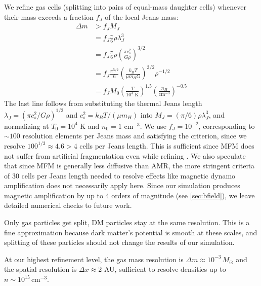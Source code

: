 \documentclass[twocolumn]{openjournal}
\newcommand{\Msun}{M_\odot}
\begin{document}
We refine gas cells (splitting into pairs of equal-mass daughter cells)
whenever their mass exceeds a fraction $f_J$ of the local Jeans mass:
\begin{equation}
	\begin{aligned}
		\Delta m & > f_J M_J                                                                                                \\
		         & = f_J \frac{\pi}{6} \rho \lambda_J^3                                                                     \\
		         & = f_J \frac{\pi}{6} \rho \left( \frac{\pi c_s^2}{G \rho} \right)^{3/2}                                   \\
		         & = f_J \frac{\pi^{5/2}}{6} \left( \frac{k_B T}{\mu m_H G} \right)^{3/2} \rho^{-1/2}                       \\
		         & = f_J M_0 \left( \frac{T}{10^4 \text{ K}} \right)^{1.5} \left( \frac{n_H}{\text{cm}^{-3}} \right)^{-0.5}
	\end{aligned}
\end{equation}
The last line follows from substituting the thermal Jeans length
$\lambda_J = (\pi c_s^2 / G\rho)^{1/2}$ and $c_s^2 = k_B T/(\mu m_H)$
into $M_J = (\pi/6)\rho\lambda_J^3$, and normalizing at
$T_0 = 10^4$ K and $n_0 = 1$ cm$^{-3}$.
We use $f_J = 10^{-2}$, corresponding to
$\sim 100$ resolution elements per Jeans mass and satisfying the
\citet{truelove97} criterion, since we resolve $100^{1/3} \approx 4.6 > 4$ cells
per Jeans length.
This is sufficient since MFM does not suffer from artificial fragmentation even
while refining \citep[in prep.]{khullar2026}. We also speculate that since MFM
is generally less diffusive than AMR, the more stringent criteria of 30 cells
per Jeans length needed to resolve effects like magnetic dynamo amplification
\citep{Federrath2011} does not necessarily apply here. Since our simulation
produces magnetic amplification by up to 4 orders of magnitude (see
\autoref{sec:bfield}), we leave detailed numerical checks to future work.

Only gas particles get split, DM particles stay at the same resolution.
This is a fine approximation because dark matter's potential is smooth at these
scales, and splitting of these particles should not change the results of our
simulation.

At our highest refinement level, the gas mass resolution is
$\Delta m \approx 10^{-3}\,\Msun$ and the spatial resolution is
$\Delta x \approx 2$ AU, sufficient to resolve densities
up to $n \sim 10^{15}\,\mathrm{cm}^{-3}$.
\end{document}
